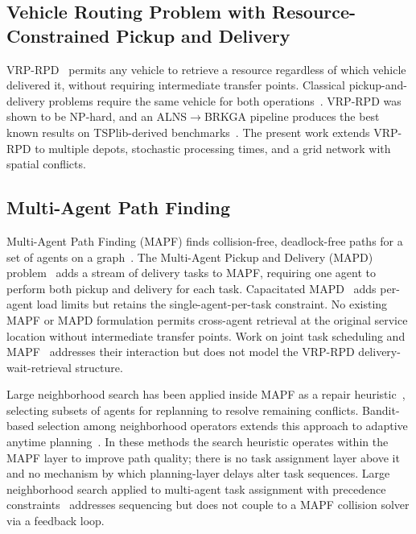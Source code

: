 \documentclass{article}
\begin{document}
\subsection{Vehicle Routing Problem with Resource-Constrained Pickup and Delivery}

VRP-RPD~\cite{vrp_rpd_gecco_2026} permits any vehicle to retrieve a resource
regardless of which vehicle delivered it, without requiring intermediate
transfer points. Classical pickup-and-delivery problems require the same vehicle
for both operations~\cite{berbeglia2007static, parragh2010variable}. VRP-RPD
was shown to be NP-hard, and an ALNS$\to$BRKGA pipeline produces the best
known results on TSPlib-derived benchmarks~\cite{vrp_rpd_gecco_2026}. The
present work extends VRP-RPD to multiple depots, stochastic processing times,
and a grid network with spatial conflicts.

\subsection{Multi-Agent Path Finding}

Multi-Agent Path Finding (MAPF) finds collision-free, deadlock-free paths for a
set of agents on a graph~\cite{stern2019multi}. The Multi-Agent Pickup and
Delivery (MAPD) problem~\cite{ma2017lifelong} adds a stream of delivery tasks
to MAPF, requiring one agent to perform both pickup and delivery for each task.
Capacitated MAPD~\cite{li2021capapd} adds per-agent load limits but retains the
single-agent-per-task constraint. No existing MAPF or MAPD formulation permits
cross-agent retrieval at the original service location without intermediate
transfer points. Work on joint task scheduling and MAPF~\cite{collab_ts_mapf_2023}
addresses their interaction but does not model the VRP-RPD delivery-wait-retrieval
structure.

Large neighborhood search has been applied inside MAPF as a repair
heuristic~\cite{mapf_lns_2021, mapf_lns2_2022}, selecting subsets of agents
for replanning to resolve remaining conflicts. Bandit-based selection among
neighborhood operators extends this approach to adaptive anytime
planning~\cite{balance_2024}. In these methods the search heuristic operates
within the MAPF layer to improve path quality; there is no task assignment layer
above it and no mechanism by which planning-layer delays alter task sequences.
Large neighborhood search applied to multi-agent task assignment with
precedence constraints~\cite{lns_mapf_2026} addresses sequencing but does not
couple to a MAPF collision solver via a feedback loop.
\end{document}
